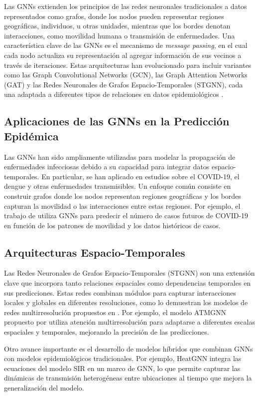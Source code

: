 Las GNNs extienden los principios de las redes neuronales tradicionales a datos representados como grafos, donde los nodos pueden representar regiones geográficas, individuos, u otras unidades, mientras que los bordes denotan interacciones, como movilidad humana o transmisión de enfermedades. Una característica clave de las GNNs es el mecanismo de \textit{message passing}, en el cual cada nodo actualiza su representación al agregar información de sus vecinos a través de iteraciones. Estas arquitecturas han evolucionado para incluir variantes como las Graph Convolutional Networks (GCN), las Graph Attention Networks (GAT) y las Redes Neuronales de Grafos Espacio-Temporales (STGNN), cada una adaptada a diferentes tipos de relaciones en datos epidemiológicos \cite{145}.

\subsection{Aplicaciones de las GNNs en la Predicción Epidémica}

Las GNNs han sido ampliamente utilizadas para modelar la propagación de enfermedades infecciosas debido a su capacidad para integrar datos espacio-temporales. En particular, se han aplicado en estudios sobre el COVID-19, el dengue y otras enfermedades transmisibles. Un enfoque común consiste en construir grafos donde los nodos representan regiones geográficas y los bordes capturan la movilidad o las interacciones entre estas regiones. Por ejemplo, el trabajo de \cite{142} utiliza GNNs para predecir el número de casos futuros de COVID-19 en función de los patrones de movilidad y los datos históricos de casos.

\subsection{Arquitecturas Espacio-Temporales}

Las Redes Neuronales de Grafos Espacio-Temporales (STGNN) son una extensión clave que incorpora tanto relaciones espaciales como dependencias temporales en sus predicciones. Estas redes combinan módulos para capturar interacciones locales y globales en diferentes resoluciones, como lo demuestran los modelos de redes multirresolución propuestos en \cite{141,143}. Por ejemplo, el modelo ATMGNN propuesto por \cite{143} utiliza atención multirresolución para adaptarse a diferentes escalas espaciales y temporales, mejorando la precisión de las predicciones.

Otro avance importante es el desarrollo de modelos híbridos que combinan GNNs con modelos epidemiológicos tradicionales. Por ejemplo, HeatGNN \cite{146} integra las ecuaciones del modelo SIR en un marco de GNN, lo que permite capturar las dinámicas de transmisión heterogéneas entre ubicaciones al tiempo que mejora la generalización del modelo.

